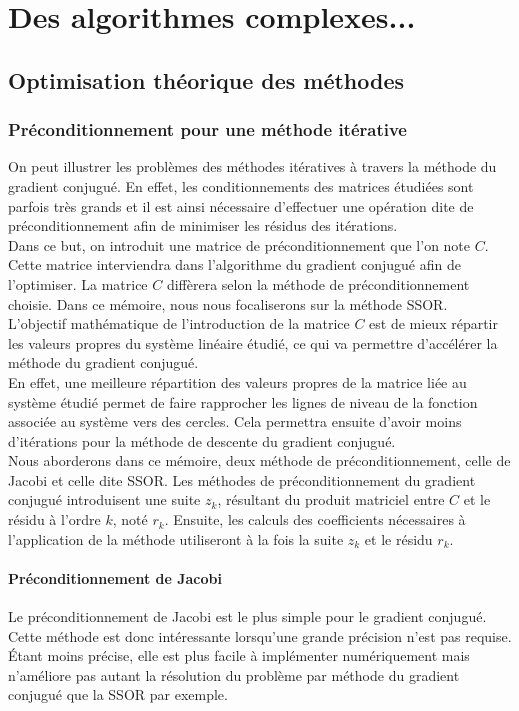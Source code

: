 \chapter{Des algorithmes complexes...}
\section{Optimisation théorique des méthodes}
\subsection{Préconditionnement pour une méthode itérative}

On peut illustrer les problèmes des méthodes itératives à travers la méthode du gradient conjugué. En effet, les conditionnements des matrices étudiées sont parfois très grands et il est ainsi nécessaire d'effectuer une opération dite de préconditionnement afin de minimiser les résidus des itérations.\\

Dans ce but, on introduit une matrice de préconditionnement que l'on note $C$. Cette matrice interviendra dans l'algorithme du gradient conjugué afin de l'optimiser. La matrice $C$ diffèrera selon la méthode de préconditionnement choisie. Dans ce mémoire, nous nous focaliserons sur la méthode SSOR. \\

L'objectif mathématique de l'introduction de la matrice $C$ est de mieux répartir les valeurs propres du système linéaire étudié, ce qui va permettre d'accélérer la méthode du gradient conjugué. \\

En effet, une meilleure répartition des valeurs propres de la matrice liée au système étudié permet de faire rapprocher les lignes de niveau de la fonction associée au système vers des cercles. Cela permettra ensuite d'avoir moins d'itérations pour la méthode de descente du gradient conjugué.\\

Nous aborderons dans ce mémoire, deux méthode de préconditionnement, celle de Jacobi et celle dite SSOR. Les méthodes de préconditionnement du gradient conjugué introduisent une suite $z_k$, résultant du produit matriciel entre $C$ et le résidu à l'ordre $k$, noté $r_k$. Ensuite, les calculs des coefficients nécessaires à l'application de la méthode utiliseront à la fois la suite $z_k$ et le résidu $r_k$. 
\subsubsection{Préconditionnement de Jacobi}
Le préconditionnement de Jacobi est le plus simple pour le gradient conjugué. Cette méthode est donc intéressante lorsqu'une grande précision n'est pas requise. Étant moins précise, elle est plus facile à  implémenter numériquement mais n'améliore pas autant la résolution du problème par méthode du gradient conjugué que la SSOR par exemple.\\

